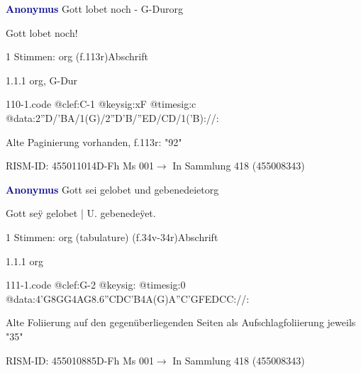 \documentclass[twocolumn]{book}
\begin{document}
\par \vspace{7pt} \textcolor{darkblue}{\textbf{Anonymus  }}\hfillplus{\textbf{[110]}}\newline Gott lobet noch - G-Dur\newline org
\par \begin{itshape}[f.113r, heading:] Gott lobet noch!\end{itshape} 
\par \textcolor{darkblue}{}  1 Stimmen: org  (f.113r)\newline Abschrift
\par 1.1.1  org, G-Dur  
\begin{filecontents*}{110-1.code}
@clef:C-1
@keysig:xF
@timesig:c
@data:2''D/'BA/1(G)/2''D'B/''ED/CD/1('B)://:
\end{filecontents*}
\newline
%
\par Alte Paginierung vorhanden, f.113r: "92"
\par RISM-ID: 455011014\newline D-Fh  Ms 001\newline $\rightarrow$ In Sammlung 418 (455008343)
      
\par \vspace{7pt} \textcolor{darkblue}{\textbf{Anonymus  }}\hfillplus{\textbf{[111]}}\newline Gott sei gelobet und gebenedeiet\newline org
\par \begin{itshape}[f.34v, at left:] Gott seÿ gelobet | U. gebenedeÿet.\end{itshape} 
\par \textcolor{darkblue}{}  1 Stimmen: org (tabulature)  (f.34v-34r)\newline Abschrift
\par 1.1.1  org  
\begin{filecontents*}{111-1.code}
@clef:G-2
@keysig:
@timesig:0
@data:4'G{8GG}4AG{8.6''CDC'B}4A(G)A''C'GFEDCC://:
\end{filecontents*}
\newline
%
\par Alte Foliierung auf den gegenüberliegenden Seiten als Aufschlagfoliierung jeweils "35"
\par RISM-ID: 455010885\newline D-Fh  Ms 001\newline $\rightarrow$ In Sammlung 418 (455008343)
      
\end{document}
